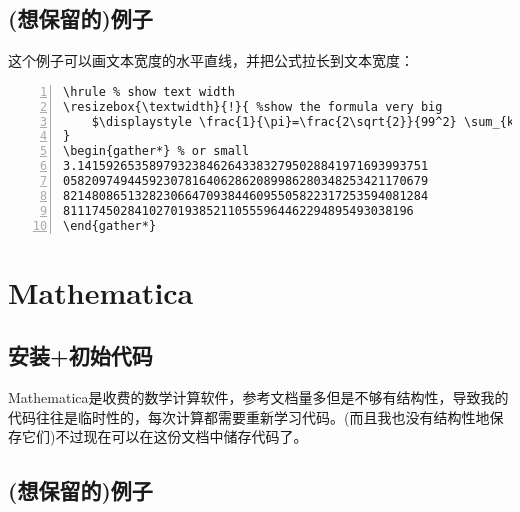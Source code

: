 \documentclass[11pt]{amsart}
\begin{document}
\subsection{(想保留的)例子}
这个例子可以画文本宽度的水平直线，并把公式拉长到文本宽度：
\begin{lstlisting}[numbers=left,numberstyle=\tiny,numbersep=10pt]
\hrule % show text width
\resizebox{\textwidth}{!}{ %show the formula very big
	$\displaystyle \frac{1}{\pi}=\frac{2\sqrt{2}}{99^2} \sum_{k=0}^{\infty} \frac{(4k)!}{k!^4}\frac{26390k+1103}{396^{4k}} $
}
\begin{gather*} % or small
3.1415926535897932384626433832795028841971693993751
058209749445923078164062862089986280348253421170679
821480865132823066470938446095505822317253594081284
8111745028410270193852110555964462294895493038196
\end{gather*}
\end{lstlisting}
\section{Mathematica}
\subsection{安装+初始代码}
Mathematica是收费的数学计算软件，参考文档量多但是不够有结构性，导致我的代码往往是临时性的，每次计算都需要重新学习代码。(而且我也没有结构性地保存它们)不过现在可以在这份文档中储存代码了。

\subsection{(想保留的)例子}
\end{document}
